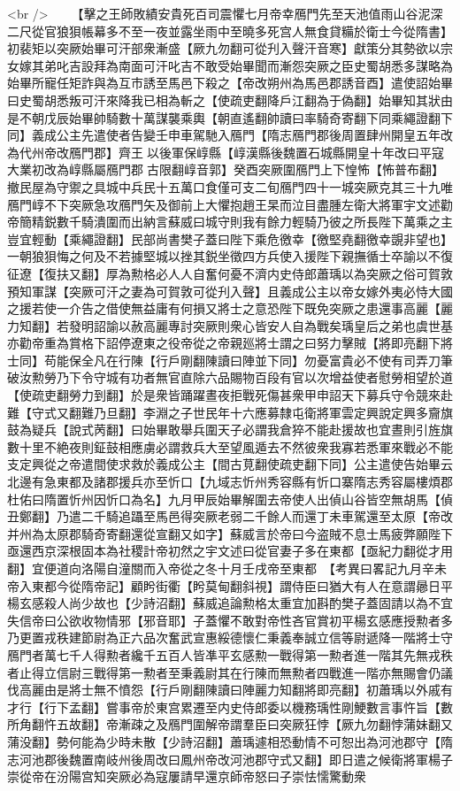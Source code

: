 <br />
　　【擊之王師敗績安貴死百司震懼七月帝幸鴈門先至天池值雨山谷泥深二尺從官狼狽帳幕多不至一夜並露坐雨中至曉多死宫人無食貸糒於衛士今從隋書】初裴矩以突厥始畢可汗部衆漸盛【厥九勿翻可從刋入聲汗音寒】獻策分其勢欲以宗女嫁其弟叱吉設拜為南面可汗叱吉不敢受始畢聞而漸怨突厥之臣史蜀胡悉多謀略為始畢所寵任矩詐與為互市誘至馬邑下殺之【帝改朔州為馬邑郡誘音酉】遣使詔始畢曰史蜀胡悉叛可汗來降我已相為斬之【使疏吏翻降戶江翻為于偽翻】始畢知其狀由是不朝戊辰始畢帥騎數十萬謀襲乘輿【朝直遙翻帥讀曰率騎奇寄翻下同乘繩證翻下同】義成公主先遣使者告變壬申車駕馳入鴈門【隋志鴈門郡後周置肆州開皇五年改為代州帝改鴈門郡】齊王以後軍保崞縣【崞漢縣後魏置石城縣開皇十年改曰平寇大業初改為崞縣屬鴈門郡古限翻崞音郭】癸酉突厥圍鴈門上下惶怖【怖普布翻】撤民屋為守禦之具城中兵民十五萬口食僅可支二旬鴈門四十一城突厥克其三十九唯鴈門崞不下突厥急攻鴈門矢及御前上大懼抱趙王杲而泣目盡腫左衛大將軍宇文述勸帝簡精鋭數千騎潰圍而出納言蘇威曰城守則我有餘力輕騎乃彼之所長陛下萬乘之主豈宜輕動【乘繩證翻】民部尚書樊子蓋曰陛下乘危徼幸【徼堅堯翻徼幸覬非望也】一朝狼狽悔之何及不若據堅城以挫其鋭坐徵四方兵使入援陛下親撫循士卒諭以不復征遼【復扶又翻】厚為勲格必人人自奮何憂不濟内史侍郎蕭瑀以為突厥之俗可賀敦預知軍謀【突厥可汗之妻為可賀敦可從刋入聲】且義成公主以帝女嫁外夷必恃大國之援若使一介告之借使無益庸有何損又將士之意恐陛下既免突厥之患還事高麗【麗力知翻】若發明詔諭以赦高麗專討突厥則衆心皆安人自為戰矣瑀皇后之弟也虞世基亦勸帝重為賞格下詔停遼東之役帝從之帝親廵將士謂之曰努力擊賊【將即亮翻下將士同】苟能保全凡在行陳【行戶剛翻陳讀曰陣並下同】勿憂富貴必不使有司弄刀筆破汝勲勞乃下令守城有功者無官直除六品賜物百段有官以次增益使者慰勞相望於道【使疏吏翻勞力到翻】於是衆皆踊躍晝夜拒戰死傷甚衆甲申詔天下募兵守令競來赴難【守式又翻難乃旦翻】李淵之子世民年十六應募隸屯衛將軍雲定興說定興多齎旗鼓為疑兵【說式苪翻】曰始畢敢舉兵圍天子必謂我倉猝不能赴援故也宜晝則引旌旗數十里不絶夜則鉦鼓相應虜必謂救兵大至望風遁去不然彼衆我寡若悉軍來戰必不能支定興從之帝遣間使求救於義成公主【間古莧翻使疏吏翻下同】公主遣使告始畢云北邊有急東都及諸郡援兵亦至忻口【九域志忻州秀容縣有忻口寨隋志秀容屬樓煩郡杜佑曰隋置忻州因忻口為名】九月甲辰始畢解圍去帝使人出偵山谷皆空無胡馬【偵丑鄭翻】乃遣二千騎追躡至馬邑得突厥老弱二千餘人而還丁未車駕還至太原【帝改并州為太原郡騎奇寄翻還從宣翻又如字】蘇威言於帝曰今盗賊不息士馬疲弊願陛下亟還西京深根固本為社稷計帝初然之宇文述曰從官妻子多在東都【亟紀力翻從才用翻】宜便道向洛陽自潼關而入帝從之冬十月壬戌帝至東都　【考異曰畧記九月辛未帝入東都今從隋帝記】顧盻街衢【盻莫甸翻斜視】謂侍臣曰猶大有人在意謂曏日平楊玄感殺人尚少故也【少詩沼翻】蘇威追論勲格太重宜加斟酌樊子蓋固請以為不宜失信帝曰公欲收物情邪【邪音耶】子蓋懼不敢對帝性吝官賞初平楊玄感應授勲者多乃更置戎秩建節尉為正六品次奮武宣惠綏德懷仁秉義奉誠立信等尉遞降一階將士守鴈門者萬七千人得勲者纔千五百人皆凖平玄感勲一戰得第一勲者進一階其先無戎秩者止得立信尉三戰得第一勲者至秉義尉其在行陳而無勲者四戰進一階亦無賜會仍議伐高麗由是將士無不憤怨【行戶剛翻陳讀曰陣麗力知翻將即亮翻】初蕭瑀以外戚有才行【行下孟翻】嘗事帝於東宫累遷至内史侍郎委以機務瑀性剛鯁數言事忤旨【數所角翻忤五故翻】帝漸疎之及鴈門圍解帝謂羣臣曰突厥狂悖【厥九勿翻悖蒲妹翻又蒲没翻】勢何能為少時未散【少詩沼翻】蕭瑀遽相恐動情不可恕出為河池郡守【隋志河池郡後魏置南岐州後周改曰鳳州帝改河池郡守式又翻】即日遣之候衛將軍楊子崇從帝在汾陽宫知突厥必為寇屢請早還京師帝怒曰子崇怯懦驚動衆